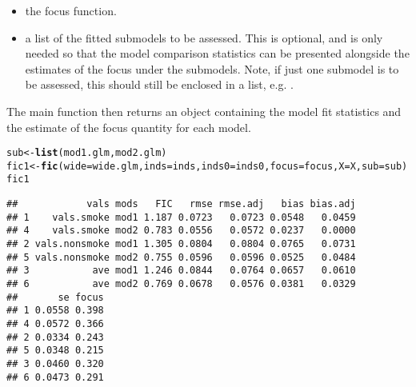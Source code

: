 \documentclass[article,shortnames,nojss,nofooter]{jss}\usepackage[]{graphicx}\usepackage[]{color}
\makeatletter
\newcommand{\hlstd}[1]{\textcolor[rgb]{0.345,0.345,0.345}{#1}}%
\newcommand{\hlkwb}[1]{\textcolor[rgb]{0.69,0.353,0.396}{#1}}%
\newcommand{\hlkwc}[1]{\textcolor[rgb]{0.333,0.667,0.333}{#1}}%
\newcommand{\hlkwd}[1]{\textcolor[rgb]{0.737,0.353,0.396}{\textbf{#1}}}%
\newenvironment{kframe}{%
 \def\at@end@of@kframe{}%
 \ifinner\ifhmode%
  \def\at@end@of@kframe{\end{minipage}}%
  \begin{minipage}{\columnwidth}%
 \fi\fi%
 \def\FrameCommand##1{\hskip\@totalleftmargin \hskip-\fboxsep
 \colorbox{shadecolor}{##1}\hskip-\fboxsep
     \hskip-\linewidth \hskip-\@totalleftmargin \hskip\columnwidth}%
 \MakeFramed {\advance\hsize-\width
   \@totalleftmargin\z@ \linewidth\hsize
   \@setminipage}}%
 {\par\unskip\endMakeFramed%
 \at@end@of@kframe}
\newenvironment{knitrout}{}{} %
\makeatother
\begin{document}
\begin{itemize}
\item {} the focus function. 

\item {} a list of the fitted submodels to be assessed.  This is optional, and is only needed so that the model comparison statistics can be presented alongside the estimates of the focus under the submodels.  Note, if just one submodel is to be assessed, this should still be enclosed in a list, e.g. . 

\end{itemize}

The main  function then returns an object containing the model fit statistics and the estimate of the focus quantity for each model. 

\begin{knitrout}
\color{fgcolor}\begin{kframe}
\begin{alltt}
\hlstd{sub} \hlkwb{<-} \hlkwd{list}\hlstd{(mod1.glm, mod2.glm)}
\hlstd{fic1} \hlkwb{<-} \hlkwd{fic}\hlstd{(}\hlkwc{wide}\hlstd{=wide.glm,} \hlkwc{inds}\hlstd{=inds,} \hlkwc{inds0}\hlstd{=inds0,} \hlkwc{focus}\hlstd{=focus,} \hlkwc{X}\hlstd{=X,} \hlkwc{sub}\hlstd{=sub)}
\hlstd{fic1}
\end{alltt}
\begin{verbatim}
##            vals mods   FIC   rmse rmse.adj   bias bias.adj
## 1    vals.smoke mod1 1.187 0.0723   0.0723 0.0548   0.0459
## 4    vals.smoke mod2 0.783 0.0556   0.0572 0.0237   0.0000
## 2 vals.nonsmoke mod1 1.305 0.0804   0.0804 0.0765   0.0731
## 5 vals.nonsmoke mod2 0.755 0.0596   0.0596 0.0525   0.0484
## 3           ave mod1 1.246 0.0844   0.0764 0.0657   0.0610
## 6           ave mod2 0.769 0.0678   0.0576 0.0381   0.0329
##       se focus
## 1 0.0558 0.398
## 4 0.0572 0.366
## 2 0.0334 0.243
## 5 0.0348 0.215
## 3 0.0460 0.320
## 6 0.0473 0.291
\end{verbatim}
\end{kframe}
\end{knitrout}
\end{document}
